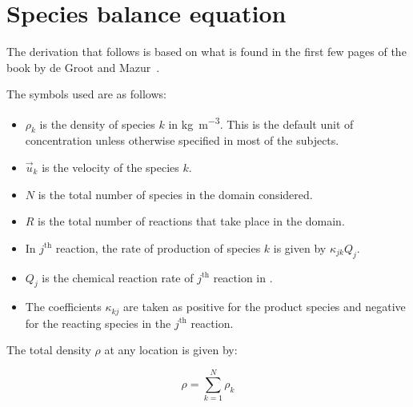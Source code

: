 \section{Species balance equation}

The derivation that follows is based on what is found in the first few pages of
the book by de Groot and Mazur~\cite{degroot}.

The symbols used are as follows: 
\begin{itemize}
 \item $\rho_k$ is the density of species $k$ in \si{\kilo\gram\per\meter\cubed}. This is the
default unit of concentration unless otherwise specified in most of the
subjects.
\item $\vec{u}_k$ is the velocity of the species $k$.
\item $N$ is the total number of species in the domain considered.
\item $R$ is the total number of reactions that take place in the domain.
\item In $j^\text{th}$ reaction, the rate of production of species $k$ is given
by $\kappa_{jk} Q_j$.
\item $Q_j$ is the chemical reaction rate of $j^\text{th}$ reaction in
\si{\kgpmcps}. 
\item The coefficients $\kappa_{kj}$ are taken as positive for the product
species and negative for the reacting species in the $j^\text{th}$ reaction.
\end{itemize}

The total density $\rho$ at any location is given by:

$$ \rho = \sum_{k=1}^{N}{\rho_k} $$


